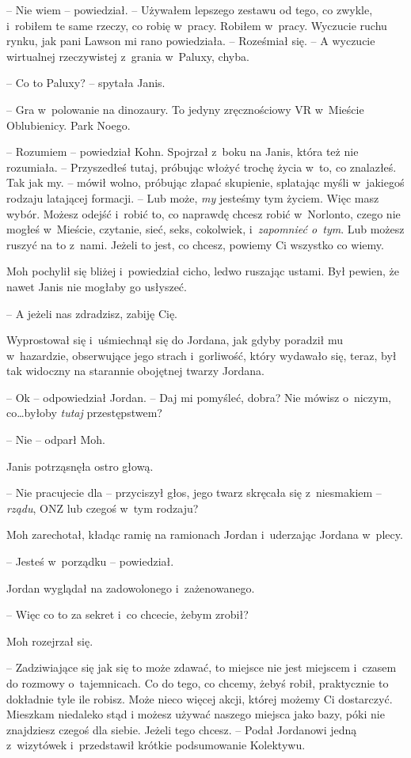 \documentclass[oneside,polish,11pt,sfheadings]{mwbk}
\begin{document}
-- Nie wiem -- powiedział. -- Używałem lepszego zestawu od tego, co zwykle, i~robiłem te
same rzeczy, co robię w~pracy. Robiłem w~pracy. Wyczucie ruchu rynku,
jak pani Lawson mi rano powiedziała. -- Roześmiał się. -- A wyczucie
wirtualnej rzeczywistej z~grania w~Paluxy, chyba.

-- Co to Paluxy? -- spytała Janis.

-- Gra w~polowanie na dinozaury. To jedyny zręcznościowy VR w~Mieście
Oblubienicy. Park Noego.

-- Rozumiem -- powiedział Kohn. Spojrzał z~boku na Janis, która też nie
rozumiała. -- Przyszedłeś tutaj, próbując włożyć trochę życia w~to, co
znalazłeś. Tak jak my. -- mówił wolno, próbując złapać skupienie,
splatając myśli w~jakiegoś rodzaju latającej formacji. -- Lub może,
\emph{my} jesteśmy tym życiem. Więc masz wybór. Możesz odejść i~robić
to, co naprawdę chcesz robić w~Norlonto, czego nie mogłeś w~Mieście,
czytanie, sieć, seks, cokolwiek, i~\emph{zapomnieć o~tym}. Lub możesz
ruszyć na to z~nami. Jeżeli to jest, co chcesz, powiemy Ci wszyst\-ko co
wiemy.

Moh pochylił się bliżej i~powiedział cicho, ledwo ruszając ustami. Był
pewien, że nawet Janis nie mogłaby go usłyszeć. 

-- A jeżeli nas
zdradzisz, zabiję Cię.

Wyprostował się i~uśmiechnął się do Jordana, jak gdyby poradził mu w~hazardzie, obserwujące jego strach i~gorliwość, który wydawało się,
teraz, był tak widoczny na starannie obojętnej twarzy Jordana.

-- Ok -- odpowiedział Jordan. -- Daj mi pomyśleć, dobra? Nie mówisz o~niczym, co\ldots byłoby \emph{tutaj} przestępstwem?

-- Nie -- odparł Moh.

Janis potrząsnęła ostro głową.

-- Nie pracujecie dla -- przyciszył głos, jego twarz skręcała się z~niesmakiem -- \emph{rządu}, ONZ lub czegoś w~tym rodzaju?

Moh zarechotał, kładąc ramię na ramionach Jordan i~uderzając Jordana w~plecy.

-- Jesteś w~porządku -- powiedział.

Jordan wyglądał na zadowolonego i~zażenowanego.

-- Więc co to za sekret i~co chcecie, żebym zrobił?

Moh rozejrzał się. 

-- Zadziwiające się jak się to może zdawać, to miejsce
nie jest miejscem i~czasem do rozmowy o~tajemnicach. Co do tego, co
chcemy, żebyś robił, praktycznie to dokładnie tyle ile robisz. Może
nieco więcej akcji, której możemy Ci dostarczyć. Mieszkam niedaleko stąd
i możesz używać naszego miejsca jako bazy, póki nie znajdziesz czegoś
dla siebie. Jeżeli tego chcesz. -- Podał Jordanowi jedną z~wizytówek i~przedstawił krótkie podsumowanie Kolektywu.
\end{document}
